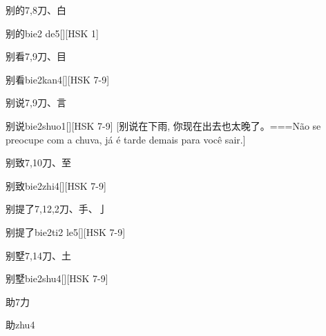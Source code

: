 \begin{Entry}{别的}{7,8}{⼑、⽩}
  \begin{Phonetics}{别的}{bie2 de5}[][HSK 1]
  \end{Phonetics}
\end{Entry}

\begin{Entry}{别看}{7,9}{⼑、⽬}
  \begin{Phonetics}{别看}{bie2kan4}[][HSK 7-9]
  \end{Phonetics}
\end{Entry}

\begin{Entry}{别说}{7,9}{⼑、⾔}
  \begin{Phonetics}{别说}{bie2shuo1}[][HSK 7-9]
    [别说在下雨, 你现在出去也太晚了。===Não se preocupe com a chuva, já é tarde demais para você sair.]
  \end{Phonetics}
\end{Entry}

\begin{Entry}{别致}{7,10}{⼑、⾄}
  \begin{Phonetics}{别致}{bie2zhi4}[][HSK 7-9]
  \end{Phonetics}
\end{Entry}

\begin{Entry}{别提了}{7,12,2}{⼑、⼿、⼅}
  \begin{Phonetics}{别提了}{bie2ti2 le5}[][HSK 7-9]
  \end{Phonetics}
\end{Entry}

\begin{Entry}{别墅}{7,14}{⼑、⼟}
  \begin{Phonetics}{别墅}{bie2shu4}[][HSK 7-9]
  \end{Phonetics}
\end{Entry}

\begin{Entry}{助}{7}{⼒}
  \begin{Phonetics}{助}{zhu4}
  \end{Phonetics}
\end{Entry}

